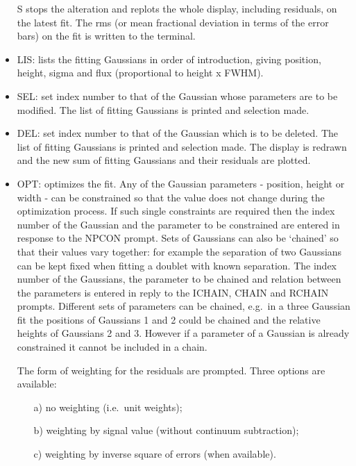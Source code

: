 \begin{itemize}
   S stops the alteration and replots the whole display, including
   residuals, on the latest fit. The rms (or mean fractional deviation
   in terms of the error bars) on the fit is written to the terminal.
\item LIS: lists the fitting Gaussians in order of introduction, giving
   position, height, sigma and flux (proportional to height x FWHM).
\item SEL: set index number to that of the Gaussian whose parameters are
   to be modified. The list of fitting Gaussians is printed and
   selection made.
\item DEL: set index number to that of the Gaussian which is to be
   deleted.  The list of fitting Gaussians is printed and selection
   made. The display is redrawn and the new sum of fitting Gaussians and
   their residuals are plotted.
\item OPT: optimizes the fit. Any of the Gaussian parameters - position,
   height or width - can be constrained so that the value does not
   change during the optimization process. If such single constraints
   are required then the index number of the Gaussian and the parameter
   to be constrained are entered in response to the NPCON prompt. Sets
   of Gaussians can also be `chained' so that their values vary
   together: for example the separation of two Gaussians can be kept
   fixed when fitting a doublet with known separation. The index number
   of the Gaussians, the parameter to be chained and relation between
   the parameters is entered in reply to the ICHAIN, CHAIN and RCHAIN
   prompts. Different sets of parameters can be chained, e.g.\ in a
   three Gaussian fit the positions of Gaussians 1 and 2 could be
   chained and the relative heights of Gaussians 2 and 3.  However if a
   parameter of a Gaussian is already constrained it cannot be included
   in a chain.

   The form of weighting for the residuals are prompted. Three options are 
   available:
   \begin{itemize}
   \item[a)] no weighting (i.e.\ unit weights);
   \item[b)] weighting by signal value (without continuum subtraction);
   \item[c)] weighting by inverse square of errors (when available).
   \end{itemize}


\end{itemize}
